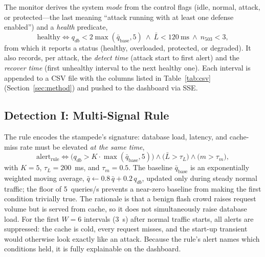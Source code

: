 \documentclass[preprint,12pt]{elsarticle}
\begin{document}
The monitor derives the system \emph{mode} from the control flags (idle, normal,
attack, or protected---the last meaning ``attack running with at least one defense
enabled'') and a \emph{health} predicate,
\begin{equation}
\mathrm{healthy} \iff q_{db} < 2\max(\bar q_{\mathrm{base}},5)\ \wedge\ \bar L < 120~\text{ms}\ \wedge\ n_{503} < 3,
\label{eq:healthy}
\end{equation}
from which it reports a status (healthy, overloaded, protected, or degraded). It also
records, per attack, the \emph{detect time} (attack start to first alert) and the
\emph{recover time} (first unhealthy interval to the next healthy one). Each interval
is appended to a CSV file with the columns listed in Table~\ref{tab:csv}
(Section~\ref{sec:method}) and pushed to the dashboard via SSE.

\subsection{Detection I: Multi-Signal Rule}
\label{sec:design-rule}
The rule encodes the stampede's signature: database load, latency, and cache-miss rate
must be elevated \emph{at the same time},
\begin{equation}
\mathrm{alert}_{\mathrm{rule}} \iff
\big(q_{db} > K\cdot\max(\bar{q}_{\mathrm{base}}, 5)\big) \wedge
\big(\bar{L} > \tau_L\big) \wedge
\big(m > \tau_m\big),
\label{eq:rule}
\end{equation}
with $K=5$, $\tau_L=200$~ms, and $\tau_m=0.5$. The baseline $\bar{q}_{\mathrm{base}}$
is an exponentially weighted moving average,
$\bar q \leftarrow 0.8\,\bar q + 0.2\,q_{db}$, updated only during steady normal
traffic; the floor of 5~queries/s prevents a near-zero baseline from making the first
condition trivially true. The rationale is that a benign flash crowd raises request
volume but is served from cache, so it does not simultaneously raise database load.
For the first $W=6$ intervals (3~s) after normal traffic starts, all alerts are
suppressed: the cache is cold, every request misses, and the start-up transient would
otherwise look exactly like an attack. Because the rule's alert names which conditions
held, it is fully explainable on the dashboard.
\end{document}
